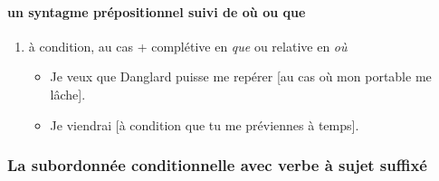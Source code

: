 \documentclass[UTF8]{report}
\begin{document}
\paragraph{un syntagme prépositionnel suivi de où ou que}
\begin{enumerate}
    \item à condition, au cas + complétive en \textit{que} ou relative en \textit{où}
    \begin{itemize}
        \item Je veux que Danglard puisse me repérer [au cas où mon portable me lâche].
        \item Je viendrai [à condition que tu me préviennes à temps].
    \end{itemize}
\end{enumerate}

\subsubsection{La subordonnée conditionnelle avec verbe à sujet suffixé}
\end{document}
